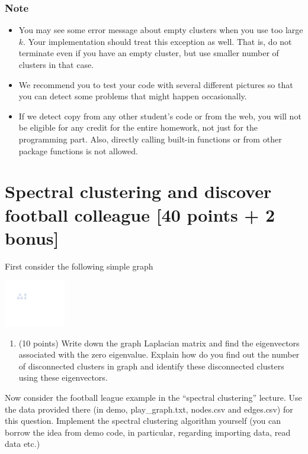 \documentclass[twoside,10pt]{article}
\begin{document}
\subsubsection*{Note}
\begin{itemize}
  \item You may see some error message about empty clusters when you use too large $k$. Your implementation should treat this exception as well. That is, do not terminate even if you have an empty cluster, but use smaller number of clusters in that case.

  \item   We recommend you to test your code with several different pictures so that you can detect some problems that might happen occasionally. 

  \item If we detect copy from any other student's code or from the web, you will not be eligible for any credit for the entire homework, not just for the programming part. Also, directly calling built-in functions or from other package functions is not allowed.
\end{itemize}

\section{Spectral clustering and discover football colleague [40 points + 2 bonus]}

First consider the following simple graph
\begin{center}
\includegraphics[width = 0.2\textwidth]{plot}
\end{center}
\begin{enumerate}
\item (10 points) Write down the graph Laplacian matrix and find the eigenvectors associated with the zero eigenvalue. Explain how do you find out the number of disconnected clusters in graph and identify these disconnected clusters using these eigenvectors.
\end{enumerate}

Now consider the football league example in the ``spectral clustering'' lecture. Use the data provided there (in demo, \textsf{play\_graph.txt}, \textsf{nodes.csv} and \textsf{edges.csv}) for this question. Implement the spectral clustering algorithm yourself (you can borrow the idea from demo code, in particular, regarding importing data, read data etc.) 
\end{document}
